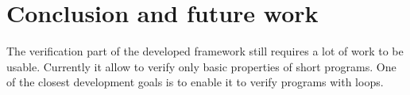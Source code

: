 \section{Conclusion and future work}

The verification part of the developed framework still requires a lot of work to be usable. Currently it allow to verify only basic properties of short programs. One of the closest development goals is to enable it to verify programs with loops.
